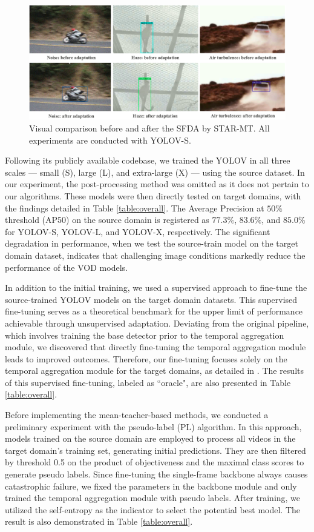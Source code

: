 \begin{figure}[t]
\small
\includegraphics[width=\linewidth]{figures/effect.png}%
\caption{Visual comparison before and after the SFDA by STAR-MT. All experiments are conducted with YOLOV-S.}
\label{fig:effect}
\end{figure}

Following its publicly available codebase, we trained the YOLOV in all three scales — small (S), large (L), and extra-large (X) — using the source dataset. In our experiment, the post-processing method was omitted as it does not pertain to our algorithms. These models were then directly tested on target domains, with the findings detailed in Table \ref{table:overall}. The Average Precision at $50\%$ threshold (AP50) on the source domain is registered as $77.3\%$, $83.6\%$, and $85.0\%$ for YOLOV-S, YOLOV-L, and YOLOV-X, respectively. The significant degradation in performance, when we test the source-train model on the target domain dataset, indicates that challenging image conditions markedly reduce the performance of the VOD models.

In addition to the initial training, we used a supervised approach to fine-tune the source-trained YOLOV models on the target domain datasets. This supervised fine-tuning serves as a theoretical benchmark for the upper limit of performance achievable through unsupervised adaptation. Deviating from the original pipeline, which involves training the base detector prior to the temporal aggregation module, we discovered that directly fine-tuning the temporal aggregation module leads to improved outcomes. Therefore, our fine-tuning focuses solely on the temporal aggregation module for the target domains, as detailed in \cite{shi2023yolov}. The results of this supervised fine-tuning, labeled as ``oracle", are also presented in Table \ref{table:overall}.

Before implementing the mean-teacher-based methods, we conducted a preliminary experiment with the pseudo-label (PL) algorithm. In this approach, models trained on the source domain are employed to process all videos in the target domain's training set, generating initial predictions. They are then filtered by threshold 0.5 on the product of objectiveness and the maximal class scores to generate pseudo labels. Since fine-tuning the single-frame backbone always causes catastrophic failure, we fixed the parameters in the backbone module and only trained the temporal aggregation module with pseudo labels. After training, we utilized the self-entropy \cite{li2021free} as the indicator to select the potential best model. The result is also demonstrated in Table \ref{table:overall}.

